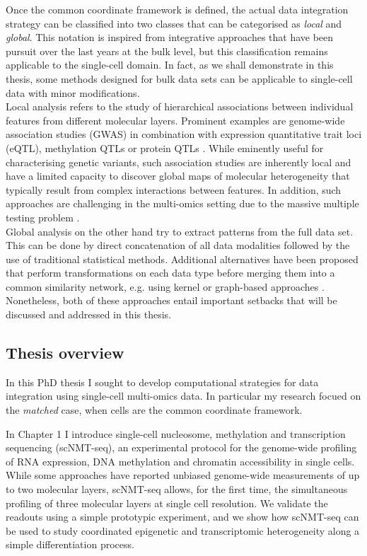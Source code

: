 Once the common coordinate framework is defined, the actual data integration strategy can be classified into two classes that can be categorised as \textit{local} and \textit{global}. This notation is inspired from integrative approaches that have been pursuit over the last years at the bulk level\cite{Ritchie2015}, but this classification remains applicable to the single-cell domain. In fact, as we shall demonstrate in this thesis, some methods designed for bulk data sets can be applicable to single-cell data with minor modifications.\\
Local analysis refers to the study of hierarchical associations between individual features from different molecular layers. Prominent examples are genome-wide association studies (GWAS) in combination with expression quantitative trait loci (eQTL), methylation QTLs or protein QTLs \cite{VanDerWijst2018,Chen2016,Pierce2018,Bonder2016}. While eminently useful for characterising genetic variants, such association studies are inherently local and have a limited capacity to discover global maps of molecular heterogeneity that typically result from complex interactions between features. In addition, such approaches are challenging in the multi-omics setting due to the massive multiple testing problem \cite{Sul2015}.\\
Global analysis on the other hand try to extract patterns from the full data set. This can be done by direct concatenation of all data modalities followed by the use of traditional statistical methods. Additional alternatives have been proposed that perform transformations on each data type before merging them into a common similarity network, e.g. using kernel or graph-based approaches \cite{Lanckriet2004, Wang2014}. Nonetheless, both of these approaches entail important setbacks that will be discussed and addressed in this thesis.

\subsection{Thesis overview}

In this PhD thesis I sought to develop computational strategies for data integration using single-cell multi-omics data. In particular my research focued on the \textit{matched} case, when cells are the common coordinate framework.

In Chapter 1 I introduce single-cell nucleosome, methylation and transcription sequencing (scNMT-seq), an experimental protocol for the genome-wide profiling of RNA expression, DNA methylation and chromatin accessibility in single cells. While some approaches have reported unbiased genome-wide measurements of up to two molecular layers, scNMT-seq allows, for the first time, the simultaneous profiling of three molecular layers at single cell resolution. We validate the readouts using a simple prototypic experiment, and we show how scNMT-seq can be used to study coordinated epigenetic and transcriptomic heterogeneity along a simple differentiation process.

